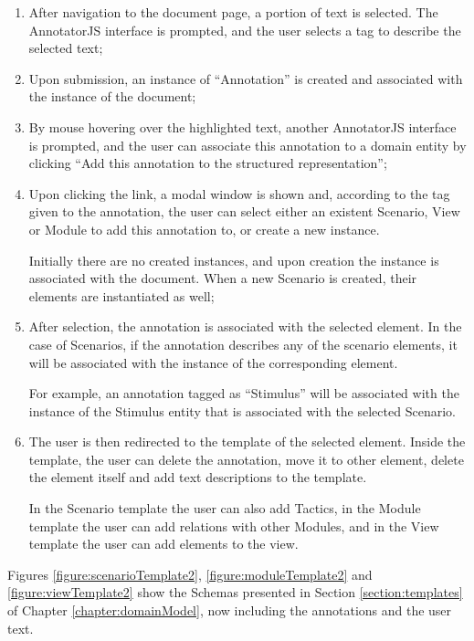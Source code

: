 \begin{enumerate}
\item After navigation to the document page, a portion of text is selected. The AnnotatorJS interface is prompted, and the user selects a tag to describe the selected text;

\item Upon submission, an instance of ``Annotation'' is created and associated with the instance of the document;

\item By mouse hovering over the highlighted text, another AnnotatorJS interface is prompted, and the user can associate this annotation to a domain entity by clicking ``Add this annotation to the structured representation'';

\item Upon clicking the link, a modal window is shown and, according to the tag given to the annotation, the user can select either an existent Scenario, View or Module to add this annotation to, or create a new instance. 

Initially there are no created instances, and upon creation the instance is associated with the document. When a new Scenario is created, their elements are instantiated as well;

\item After selection, the annotation is associated with the selected element. In the case of Scenarios, if the annotation describes any of the scenario elements, it will be associated with the instance of the corresponding element. 

For example, an annotation tagged as ``Stimulus'' will be associated with the instance of the Stimulus entity that is associated with the selected Scenario.

\item The user is then redirected to the template of the selected element. Inside the template, the user can delete the annotation, move it to other element, delete the element itself and add text descriptions to the template. 

In the Scenario template the user can also add Tactics, in the Module template the user can add relations with other Modules, and in the View template the user can add elements to the view.
\end{enumerate}

Figures \ref{figure:scenarioTemplate2}, \ref{figure:moduleTemplate2} and \ref{figure:viewTemplate2} show the Schemas presented in Section \ref{section:templates} of Chapter \ref{chapter:domainModel}, now including the annotations and the user text.

